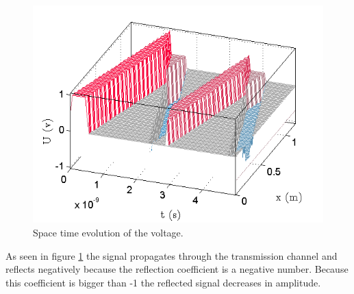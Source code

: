 \documentclass[final]{scrreprt} %
\begin{document}
\begin{figure}[H]
	\centering
	\includegraphics[width=\linewidth]{resources/space-time-voltage.png}
	\caption{Space time evolution of the voltage.}
	\label{fig:space-time-voltage}
\end{figure}
As seen in figure \ref{fig:space-time-voltage} the signal propagates through the transmission channel and reflects negatively because the reflection coefficient is a negative number. Because this coefficient is bigger than -1 the reflected signal decreases in amplitude.
\end{document}
